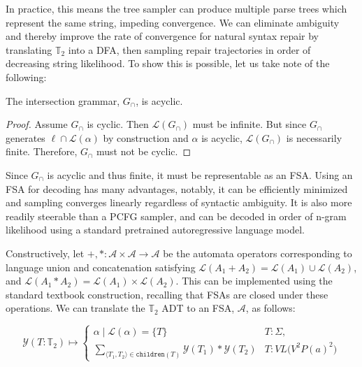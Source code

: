 \documentclass[sigplan,acmsmall,nonacm,screen]{acmart}\settopmatter{printfolios=false,printccs=false,printacmref=false}
\begin{document}
In practice, this means the tree sampler can produce multiple parse trees which represent the same string, impeding convergence. We can eliminate ambiguity and thereby improve the rate of convergence for natural syntax repair by translating $\mathbb{T}_2$ into a DFA, then sampling repair trajectories in order of decreasing string likelihood. To show this is possible, let us take note of the following:

  \begin{lemma}\label{lemma:acyc_gram}
    The intersection grammar, $G_\cap$, is acyclic.
  \end{lemma}

  \begin{proof}
    Assume $G_\cap$ is cyclic. Then $\mathcal{L}(G_\cap)$ must be infinite. But since $G_\cap$ generates $\ell \cap \mathcal{L}(\alpha)$ by construction and $\alpha$ is acyclic, $\mathcal{L}(G_\cap)$ is necessarily finite. Therefore, $G_\cap$ must not be cyclic.
  \end{proof}

  Since $G_\cap$ is acyclic and thus finite, it must be representable as an FSA. Using an FSA for decoding has many advantages, notably, it can be efficiently minimized and sampling converges linearly regardless of syntactic ambiguity. It is also more readily steerable than a PCFG sampler, and can be decoded in order of n-gram likelihood using a standard pretrained autoregressive language model.

Constructively, let $+, *: \mathcal{A}\times \mathcal{A} \rightarrow \mathcal{A}$ be the automata operators corresponding to language union and concatenation satisfying $\mathcal{L}(A_1 + A_2) = \mathcal{L}(A_1)\cup\mathcal{L}(A_2)$, and $\mathcal{L}(A_1 * A_2) = \mathcal{L}(A_1)\times\mathcal{L}(A_2)$. This can be implemented using the standard textbook construction, recalling that FSAs are closed under these operations. We can translate the $\mathbb{T}_2$ ADT to an FSA, $\mathcal{A}$, as follows:

\begin{equation}
\mathcal{Y}(T:\mathbb{T}_2) \mapsto \begin{cases}
\alpha \mid \mathcal{L}(\alpha) = \{T\} & T: \Sigma, \\
\sum_{\langle T_1, T_2\rangle \in \texttt{children}(T)} \mathcal{Y}(T_1)*\mathcal{Y}(T_2) & T: VL\big(V^2P(a)^2\big)
\end{cases}
\end{equation}
\end{document}
